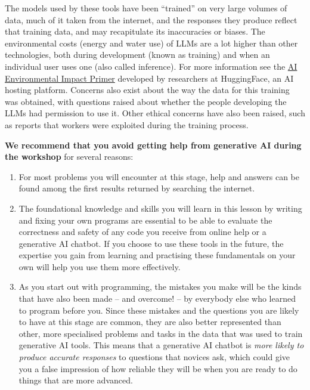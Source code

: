 \documentclass[
]{book}
\providecommand{\tightlist}{%
  \setlength{\itemsep}{0pt}\setlength{\parskip}{0pt}}
\begin{document}
The models used by these tools have been ``trained'' on very large volumes of data, much of it taken from the internet, and the responses they produce reflect that training data, and may recapitulate its inaccuracies or biases.
The environmental costs (energy and water use) of LLMs are a lot higher than other technologies, both during development (known as training) and when an individual user uses one (also called inference). For more information see the \href{https://huggingface.co/blog/sasha/ai-environment-primer}{AI Environmental Impact Primer} developed by researchers at HuggingFace, an AI hosting platform.
Concerns also exist about the way the data for this training was obtained, with questions raised about whether the people developing the LLMs had permission to use it.
Other ethical concerns have also been raised, such as reports that workers were exploited during the training process.

\textbf{We recommend that you avoid getting help from generative AI during the workshop} for several reasons:

\begin{enumerate}
\def\labelenumi{\arabic{enumi}.}
\tightlist
\item
  For most problems you will encounter at this stage, help and answers can be found among the first results returned by searching the internet.
\item
  The foundational knowledge and skills you will learn in this lesson by writing and fixing your own programs are essential to be able to evaluate the correctness and safety of any code you receive from online help or a generative AI chatbot.
  If you choose to use these tools in the future, the expertise you gain from learning and practising these fundamentals on your own will help you use them more effectively.
\item
  As you start out with programming, the mistakes you make will be the kinds that have also been made -- and overcome! -- by everybody else who learned to program before you.
  Since these mistakes and the questions you are likely to have at this stage are common, they are also better represented than other, more specialised problems and tasks in the data that was used to train generative AI tools.
  This means that a generative AI chatbot is \emph{more likely to produce accurate responses} to questions that novices ask, which could give you a false impression of how reliable they will be when you are ready to do things that are more advanced.
\end{enumerate}
\end{document}
